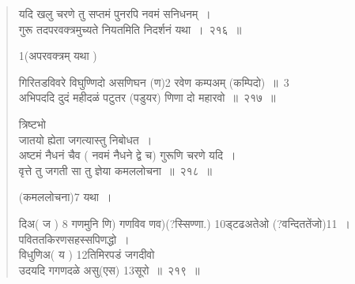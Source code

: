 \documentclass[11pt, openany]{book}
\begin{document}
\begin{quote}
{\na यदि खलु चरणे तु सप्तमं पुनरपि नवमं सनिधनम्~।\\
गुरू तदपरवक्त्रमुच्यते नियतमिति निदर्शनं यथा~।~२१६~॥}

1(अपरवक्त्रम् यथा ) 

{\na गिरितडविवरे विघुण्णिदो असणिघन (ण)2 रवेण कम्पअम् (कम्पिदो)~॥~3 \\
 अभिपददि दुदं महीदळं पटुतर (पडुयर) णिणा दो महारवो~॥~२१७~॥}

{ त्रिष्टभो\\
जातयो ह्येता जगत्यास्तु निबोधत~। }\\

{\na अष्टमं नैधनं चैव ( नवमं नैधने द्वे च) गुरूणि चरणे यदि~। \\
वृत्ते तु जगती सा तु ज्ञेया कमललोचना~॥~२१८~॥}

(कमललोचना)7 यथा~।

{\na दिअ( ज ) 8 गणमुनि णि) गणविव णव)(?स्सिण्णा.) 10ड्टढअतेओ (?वन्दिततेंजो)11~।\\
पविततकिरणसहस्सपिणद्धो~। \\
विधुणिअ( य ) 12तिमिरपडं जगदीवो \\
उदयदि गगणदळे असु(एस) 13सूरो~॥~२१९~॥}

{}
\end{quote}


\newpage
\end{document}
